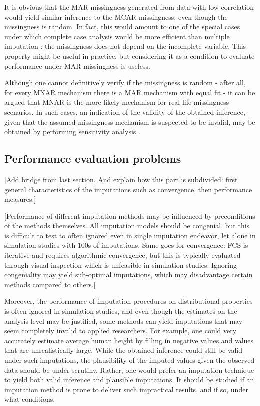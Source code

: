 \documentclass[bimj,fleqn]{w-art}
\begin{document}
It is obvious that the MAR missingness generated from data with low correlation would yield similar inference to the MCAR missingness, even though the missingness is random. In fact, this would amount to one of the special cases under which complete case analysis would be more efficient than multiple imputation \citep[see e.g.][p. 48]{fimd}: the missingness does not depend on the incomplete variable. This property might be useful in practice, but considering it as a condition to evaluate performance under MAR missingness is useless. 

Although one cannot definitively verify if the missingness is random - after all, for every MNAR mechanism there is a MAR mechanism with equal fit \citep{molenberghs2008every} - it can be argued that MNAR is the more likely mechanism for real life missingness scenarios. In such cases, an indication of the validity of the obtained inference, given that the assumed missingness mechanism is suspected to be invalid, may be obtained by performing sensitivity analysis \citep[see e.g.][part 5]{molenberghs2014handbook}.


\subsection{Performance evaluation problems}

[Add bridge from last section. And explain how this part is subdivided: first general characteristics of the imputations such as convergence, then performance measures.]

[Performance of different imputation methods may be influenced by preconditions of the methods themselves. All imputation models should be congenial, but this is difficult to test to often ignored even in single imputation endeavor, let alone in simulation studies with 100s of imputations. Same goes for convergence: FCS is iterative and requires algorithmic convergence, but this is typically evaluated through visual inspection which is unfeasible in simulation studies. Ignoring congeniality may yield sub-optimal imputations, which may disadvantage certain methods compared to others.]

Moreover, the performance of imputation procedures on distributional properties is often ignored in simulation studies, and even though the estimates on the analysis level may be justified, some methods can yield imputations that may seem completely invalid to applied researchers. For example, one could very accurately estimate average human height by filling in negative values and values that are unrealistically large. While the obtained inference could still be valid under such imputations, the plausibility of the imputed values given the observed data should be under scrutiny. Rather, one would prefer an imputation technique to yield both valid inference and plausible imputations. It should be studied if an imputation method is prone to deliver such impractical results, and if so, under what conditions.
\end{document}
